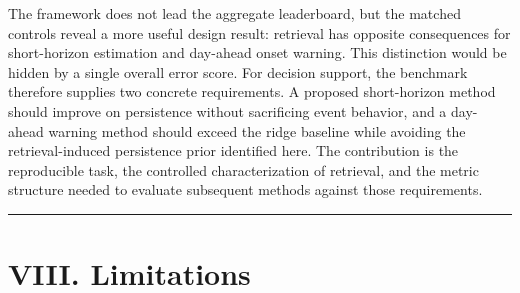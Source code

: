 \documentclass[
  10pt,
  a4paper,
]{article}
\begin{document}
The framework does not lead the aggregate leaderboard, but the matched
controls reveal a more useful design result: retrieval has opposite
consequences for short-horizon estimation and day-ahead onset warning.
This distinction would be hidden by a single overall error score. For
decision support, the benchmark therefore supplies two concrete
requirements. A proposed short-horizon method should improve on
persistence without sacrificing event behavior, and a day-ahead warning
method should exceed the ridge baseline while avoiding the
retrieval-induced persistence prior identified here. The contribution is
the reproducible task, the controlled characterization of retrieval, and
the metric structure needed to evaluate subsequent methods against those
requirements.

\begin{center}\rule{0.5\linewidth}{0.5pt}\end{center}

\section{VIII. Limitations}\label{viii.-limitations}
\end{document}
